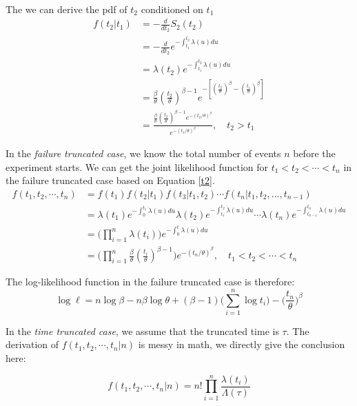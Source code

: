 \documentclass[12pt]{book}
\numberwithin{equation}{chapter}
\begin{document}
The we can derive the pdf of \(t_2\) conditioned on \(t_1\)
\begin{equation}\label{t2}
\begin{aligned}
f(t_2|t_1) & = - \frac{d}{dt_2}S_2(t_2)\\
& = - \frac{d}{dt_2}e^{-\int_{t_1}^{t_2}\lambda(u)du}\\
& = \lambda(t_2)e^{-\int_{t_1}^{t_2}\lambda(u)du}\\
& = \frac{\beta}{\theta}(\frac{t_2}{\theta})^{\beta - 1}e^{-[(\frac{t_2}{\theta})^\beta - (\frac{t_1}{\theta})^\beta]}\\
& = \frac{\frac{\beta}{\theta}(\frac{t_2}{\theta})^{\beta - 1}e^{-(t_2/\theta)^\beta }}{e^{- (t_1/\theta)^\beta}}, \quad t_2 > t_1
\end{aligned}
\end{equation}

In the \emph{failure truncated case}, we know the total number of events \(n\) before the experiment starts. We can get the joint likelihood function for \(t_1 < t_2 < \cdots < t_n\) in the failure truncated case based on Equation \ref{t2}.
\begin{equation}\label{pdfn}
\begin{aligned}
f(t_1, t_2, \cdots, t_n) & = f(t_1)f(t_2|t_1)f(t_3|t_1, t_2) \cdots f(t_n|t_1, t_2, \dots, t_{n - 1}) \\
& = \lambda (t_1)e^{-\int_{0}^{t_1} \dot \lambda (u)du}\lambda (t_2)e^{-\int_{t_1}^{t_2} \dot \lambda (u)du}\cdots\lambda (t_n)e^{-\int_{t_{n-1}}^{t_n}\lambda (u)du}\\
& = \Big(\prod_{i=1}^n\lambda(t_i)\Big)e^{-\int_0^t\lambda(u)du}\\
& = \Big(\prod_{i=1}^n\frac{\beta}{\theta}(\frac{t_i}{\theta})^{\beta - 1}\Big)e^{-(t_n/\theta)^\beta}, \quad t_1 < t_2 < \cdots < t_n
\end{aligned}
\end{equation}

The log-likelihood function in the failure truncated case is therefore:
\[\log \ell = n\log\beta - n\beta\log\theta + (\beta - 1)\bigg(\sum_{i=1}^n\log t_i\bigg) - \Big(\frac{t_n}{\theta}\Big)^\beta\]

In the \emph{time truncated case}, we assume that the truncated time is \(\tau\). The derivation of \(f(t_1, t_2, \cdots, t_n|n)\) is messy in math, we directly give the conclusion here:

\[f(t_1, t_2, \cdots, t_n|n) = n!\prod_{i=1}^n\frac{\lambda(t_i)}{\Lambda(\tau)}\]
\end{document}
